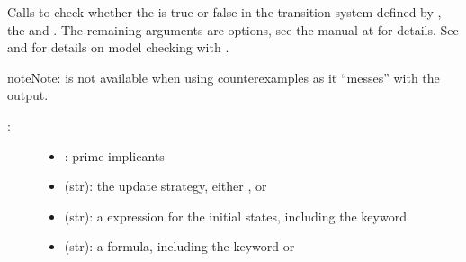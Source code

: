 \documentclass[letterpaper,10pt,english]{sphinxmanual}
\begin{document}
\begin{fulllineitems}
\label{\detokenize{ModelChecking:PyBoolNet.ModelChecking.check_primes_with_counterexample}}
Calls {\hyperref[\detokenize{Installation:installation-nusmv}]{}} to check whether the  is true or false in the transition system defined by ,
the  and .
The remaining arguments are {\hyperref[\detokenize{Installation:installation-nusmv}]{}} options, see the manual at  for details.
See {\hyperref[\detokenize{ModelChecking:primes2smv}]{}} and {\hyperref[\detokenize{Manual:sec-model-checking}]{}} for details on model checking with .

\begin{sphinxadmonition}{note}{Note:}
 is not available when using counterexamples as it “messes” with the output.
\end{sphinxadmonition}
\begin{description}
\item[{:}] \leavevmode\begin{itemize}
\item {} 
: prime implicants

\item {} 
 (str): the update strategy, either ,  or 

\item {} 
 (str): a {\hyperref[\detokenize{Installation:installation-nusmv}]{}} expression for the initial states, including the keyword 

\item {} 
 (str): a {\hyperref[\detokenize{Installation:installation-nusmv}]{}} formula, including the keyword  or 


\end{itemize}
\end{description}
\end{fulllineitems}
\end{document}
